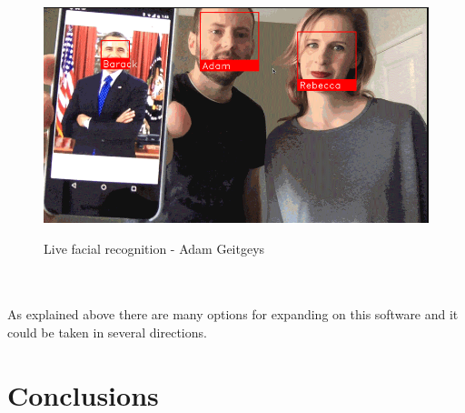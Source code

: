 \documentclass{article}
\begin{document}
\begin{figure}[h!]
\centering
\includegraphics[scale=0.5]{images/facerec.png}
\caption{Live facial recognition - Adam Geitgeys}\cite{ageitgey}
\end{figure}
\\\\
As explained above there are many options for expanding on this software and it could be taken in several directions.

\newpage

\section{Conclusions}


\newpage
\printbibliography
\end{document}
